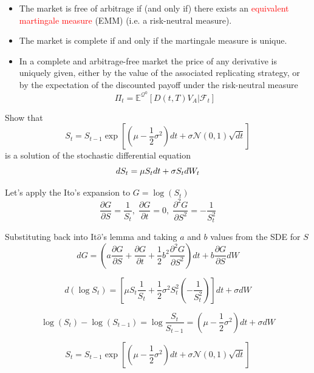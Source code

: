 \documentclass[12pt,a4paper]{book}
\begin{document}
\begin{itemize}
\item The market is free of arbitrage if (and only if) there exists an \textcolor{red}{equivalent martingale measure} (EMM) (i.e. a risk-neutral measure).
\item The market is complete if and only if the martingale measure is unique.
\item In a complete and arbitrage-free market the price of any derivative is uniquely given, either by the value of the associated replicating strategy, or by the expectation of the discounted payoff under the risk-neutral measure
\begin{equation}
\Pi_t = \mathbb{E}^{\mathcal{Q}^0}[D(t,T)V_A|\mathcal{F}_t]
\label{eq:risk_neutral_pricing}
\end{equation}
\end{itemize}

\begin{question}[subtitle=Geometric Brownian Motion]
Show that 
\begin{equation*}
S_t = S_{t-1}\exp\left[\left(\mu-\frac{1}{2}\sigma^2\right)dt + \sigma\mathcal{N}(0,1)\sqrt{dt}\right] 
\end{equation*}
is a solution of the stochastic differential equation
\begin{equation*}
dS_t = \mu S_t dt + \sigma S_t dW_t \\
\end{equation*}
\end{question}

\begin{solution}
Let's apply the Ito's expansion to $G=\log(S_t)$ 
\begin{equation*}
\frac{\partial G}{\partial S}=\frac{1}{S_t},\;\frac{\partial G}{\partial t}=0,\;\frac{\partial^2 G}{\partial S^2}=-\frac{1}{S_t^2}
\end{equation*}

Substituting back into It$\hat{o}$'s lemma and taking $a$ and $b$ values from the SDE for $S$
\begin{equation*}
dG = \left(a\frac{\partial G}{\partial S} + \frac{\partial G}{\partial t} + \frac{1}{2}b^2\frac{\partial^2 G}{\partial S^2}\right)dt + b\frac{\partial G}{\partial S} dW
\end{equation*}

\begin{equation*}
d(\log S_t) = \left[\mu S_t\frac{1}{S_t} + \frac{1}{2}\sigma^2S_t^2\left(-\frac{1}{S_t^2}\right)\right]dt + \sigma dW
\end{equation*}

\begin{equation*}
\log(S_t) - \log(S_{t-1}) = \log\frac{S_t}{S_{t-1}}=\left(\mu - \frac{1}{2}\sigma^2\right)dt + \sigma dW 
\end{equation*}	

\begin{equation*}
S_t = S_{t-1}\exp\left[\left(\mu-\frac{1}{2}\sigma^2\right)dt + \sigma\mathcal{N}(0,1)\sqrt{dt}\right] 
\end{equation*}
\end{solution}
\end{document}
